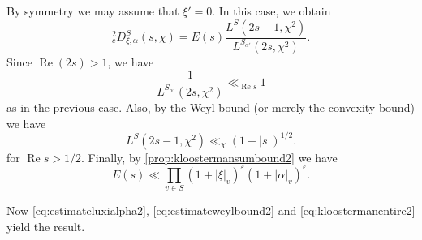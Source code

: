 \documentclass[10pt,oneside,reqno]{amsart}
\makeatletter
\renewcommand\Re{\mathop{\mathrm{Re}}}
\theoremstyle{THEOREM}
\theoremstyle{DEFINITION}
\theoremstyle{EXERCISE}
\numberwithin{equation}{section}
\renewenvironment{proof}[1][\proofname]{\par
  \vspace{-6pt}
  \pushQED{\qed}
  \normalfont \topsep6\p@\@plus6\p@\relax
  \trivlist
  \item[\hskip\labelsep\rmfamily\bfseries
    #1\@addpunct{:}]\ignorespaces
}{
  \popQED\endtrivlist\@endpefalse
  \vspace{-6pt}
}
\makeatother
\begin{document}
\begin{proof}[Proof of \autoref{thm:kloostermanmoderate}]
By symmetry we may assume that $\xi'=0$. In this case, we obtain
\[
_c^2D_{\xi,\alpha}^S(s,\chi)=E(s)\frac{L^{S}(2s-1,\chi^2)}{L^{S_{\alpha'}}(2s,\chi^2)}.
\]
Since $\Re (2s)>1$, we have
\begin{equation}\label{eq:estimateluxialpha2}
\frac{1}{L^{S_{\alpha'}}(2s,\chi^2)}\ll_{\Re s} 1
\end{equation}
as in the previous case. Also, by the Weyl bound (or merely the convexity bound) we have
\begin{equation}\label{eq:estimateweylbound2}
L^S(2s-1,\chi^2)\ll_\chi (1+|s|)^{1/2}.
\end{equation}
for $\Re s>1/2$. Finally, by \autoref{prop:kloostermansumbound2} we have
\begin{equation}\label{eq:kloostermanentire2}
E(s)\ll \prod_{v\in S}(1+|\xi|_v)^{\varepsilon}(1+|\alpha|_v)^{\varepsilon}.
\end{equation}

Now \eqref{eq:estimateluxialpha2}, \eqref{eq:estimateweylbound2} and \eqref{eq:kloostermanentire2} yield the result.
\end{proof}
\end{document}
